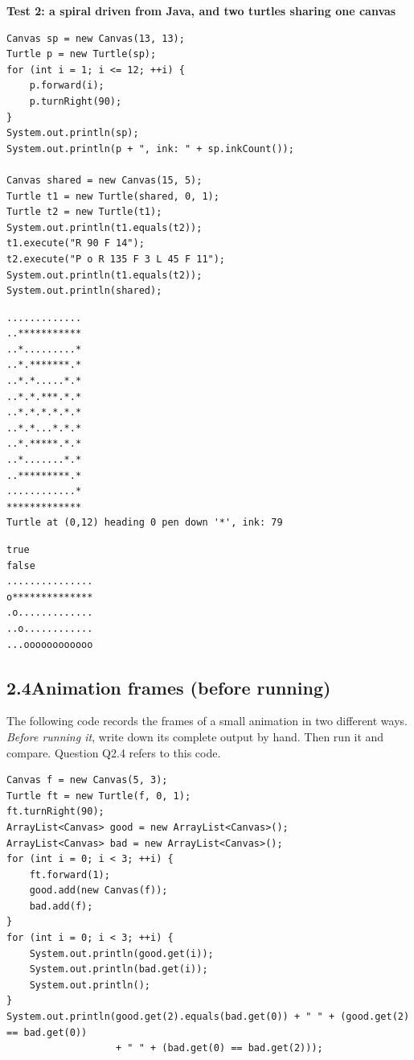 \documentclass[11pt,a4paper]{article}
\newcommand{\spec}[1]{\par\smallskip\textbf{#1}\par}
\begin{document}
\spec{Test 2: a spiral driven from Java, and two turtles sharing one canvas}
\begin{lstlisting}
Canvas sp = new Canvas(13, 13);
Turtle p = new Turtle(sp);
for (int i = 1; i <= 12; ++i) {
    p.forward(i);
    p.turnRight(90);
}
System.out.println(sp);
System.out.println(p + ", ink: " + sp.inkCount());

Canvas shared = new Canvas(15, 5);
Turtle t1 = new Turtle(shared, 0, 1);
Turtle t2 = new Turtle(t1);
System.out.println(t1.equals(t2));
t1.execute("R 90 F 14");
t2.execute("P o R 135 F 3 L 45 F 11");
System.out.println(t1.equals(t2));
System.out.println(shared);
\end{lstlisting}
\begin{minipage}[t]{0.6\textwidth}
\begin{lstlisting}[style=out]
.............
..***********
..*.........*
..*.*******.*
..*.*.....*.*
..*.*.***.*.*
..*.*.*.*.*.*
..*.*...*.*.*
..*.*****.*.*
..*.......*.*
..*********.*
............*
*************
Turtle at (0,12) heading 0 pen down '*', ink: 79
\end{lstlisting}
\end{minipage}\hfill
\begin{minipage}[t]{0.36\textwidth}
\begin{lstlisting}[style=out]
true
false
...............
o**************
.o.............
..o............
...oooooooooooo
\end{lstlisting}
\end{minipage}

\subsection*{2.4\quad Animation frames (before running)}

The following code records the frames of a small animation in two different
ways. \emph{Before running it}, write down its complete output by hand. Then
run it and compare. Question Q2.4 refers to this code.
\begin{lstlisting}
Canvas f = new Canvas(5, 3);
Turtle ft = new Turtle(f, 0, 1);
ft.turnRight(90);
ArrayList<Canvas> good = new ArrayList<Canvas>();
ArrayList<Canvas> bad = new ArrayList<Canvas>();
for (int i = 0; i < 3; ++i) {
    ft.forward(1);
    good.add(new Canvas(f));
    bad.add(f);
}
for (int i = 0; i < 3; ++i) {
    System.out.println(good.get(i));
    System.out.println(bad.get(i));
    System.out.println();
}
System.out.println(good.get(2).equals(bad.get(0)) + " " + (good.get(2) == bad.get(0))
                   + " " + (bad.get(0) == bad.get(2)));
\end{lstlisting}
\end{document}
